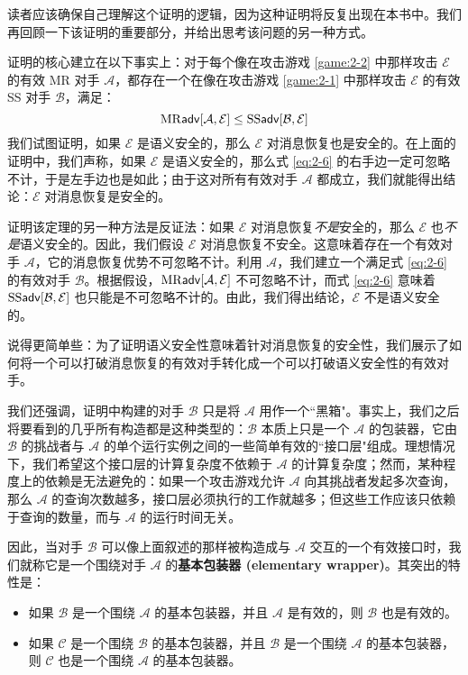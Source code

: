 \vspace{5pt}

读者应该确保自己理解这个证明的逻辑，因为这种证明将反复出现在本书中。我们再回顾一下该证明的重要部分，并给出思考该问题的另一种方式。

证明的核心建立在以下事实上：对于每个像在攻击游戏 \ref{game:2-2} 中那样攻击 $\mathcal{E}$ 的有效 MR 对手 $\mathcal{A}$，都存在一个在像在攻击游戏 \ref{game:2-1} 中那样攻击 $\mathcal{E}$ 的有效 SS 对手 $\mathcal{B}$，满足：
\begin{equation}\label{eq:2-6}
{\rm MR\mathsf{adv}}[\mathcal{A},\mathcal{E}]\leq{\rm SS\mathsf{adv}}[\mathcal{B},\mathcal{E}]
\end{equation}
我们试图证明，如果 $\mathcal{E}$ 是语义安全的，那么 $\mathcal{E}$ 对消息恢复也是安全的。在上面的证明中，我们声称，如果 $\mathcal{E}$ 是语义安全的，那么式 \ref{eq:2-6} 的右手边一定可忽略不计，于是左手边也是如此；由于这对所有有效对手 $\mathcal{A}$ 都成立，我们就能得出结论：$\mathcal{E}$ 对消息恢复是安全的。

证明该定理的另一种方法是反证法：如果 $\mathcal{E}$ 对消息恢复\emph{不是}安全的，那么 $\mathcal{E}$ 也\emph{不是}语义安全的。因此，我们假设 $\mathcal{E}$ 对消息恢复不安全。这意味着存在一个有效对手 $\mathcal{A}$，它的消息恢复优势不可忽略不计。利用 $\mathcal{A}$，我们建立一个满足式 \ref{eq:2-6} 的有效对手 $\mathcal{B}$。根据假设，${\rm MR\mathsf{adv}}[\mathcal{A},\mathcal{E}]$ 不可忽略不计，而式 \ref{eq:2-6} 意味着 ${\rm SS\mathsf{adv}}[\mathcal{B},\mathcal{E}]$ 也只能是不可忽略不计的。由此，我们得出结论，$\mathcal{E}$ 不是语义安全的。

说得更简单些：为了证明语义安全性意味着针对消息恢复的安全性，我们展示了如何将一个可以打破消息恢复的有效对手转化成一个可以打破语义安全性的有效对手。

我们还强调，证明中构建的对手 $\mathcal{B}$ 只是将 $\mathcal{A}$ 用作一个``黑箱"。事实上，我们之后将要看到的几乎所有构造都是这种类型的：$\mathcal{B}$ 本质上只是一个 $\mathcal{A}$ 的包装器，它由 $\mathcal{B}$ 的挑战者与 $\mathcal{A}$ 的单个运行实例之间的一些简单有效的``接口层"组成。理想情况下，我们希望这个接口层的计算复杂度不依赖于 $\mathcal{A}$ 的计算复杂度；然而，某种程度上的依赖是无法避免的：如果一个攻击游戏允许 $\mathcal{A}$ 向其挑战者发起多次查询，那么 $\mathcal{A}$ 的查询次数越多，接口层必须执行的工作就越多；但这些工作应该只依赖于查询的数量，而与 $\mathcal{A}$ 的运行时间无关。

因此，当对手 $\mathcal{B}$ 可以像上面叙述的那样被构造成与 $\mathcal{A}$ 交互的一个有效接口时，我们就称它是一个围绕对手 $\mathcal{A}$ 的\textbf{基本包装器 (elementary wrapper)}。其突出的特性是：
\begin{itemize}
	\item 如果 $\mathcal{B}$ 是一个围绕 $\mathcal{A}$ 的基本包装器，并且 $\mathcal{A}$ 是有效的，则 $\mathcal{B}$ 也是有效的。
	\item 如果 $\mathcal{C}$ 是一个围绕 $\mathcal{B}$ 的基本包装器，并且 $\mathcal{B}$ 是一个围绕 $\mathcal{A}$ 的基本包装器，则 $\mathcal{C}$ 也是一个围绕 $\mathcal{A}$ 的基本包装器。
\end{itemize}

